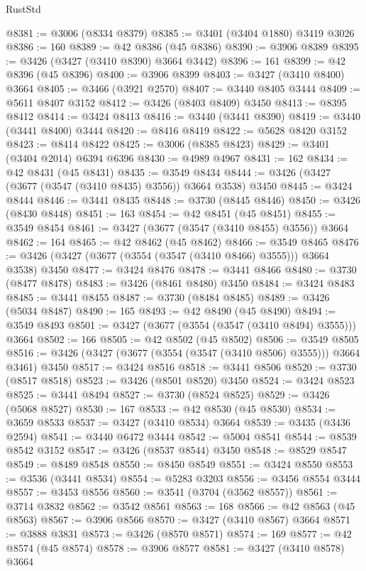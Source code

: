 \begin{lexlean}{RustStd}
\begin{coremodule}
@8381 := @3006 (@8334 @8379)
@8385 := @3401 (@3404 @1880) @3419 @3026
@8386 := 160
@8389 := @42 @8386 (@45 @8386)
@8390 := @3906 @8389
@8395 := @3426 (@3427 (@3410 @8390) @3664 @3442)
@8396 := 161
@8399 := @42 @8396 (@45 @8396)
@8400 := @3906 @8399
@8403 := @3427 (@3410 @8400) @3664
@8405 := @3466 (@3921 @2570)
@8407 := @3440 @8405 @3444
@8409 := @5611 @8407 @3152
@8412 := @3426 (@8403 @8409) @3450
@8413 := @8395 @8412
@8414 := @3424 @8413
@8416 := @3440 (@3441 @8390)
@8419 := @3440 (@3441 @8400) @3444
@8420 := @8416 @8419
@8422 := @5628 @8420 @3152
@8423 := @8414 @8422
@8425 := @3006 (@8385 @8423)
@8429 := @3401 (@3404 @2014) @6394 @6396
@8430 := @4989 @4967
@8431 := 162
@8434 := @42 @8431 (@45 @8431)
@8435 := @3549 @8434
@8444 := @3426 (@3427 (@3677 (@3547 (@3410 @8435) @3556)) @3664 @3538) @3450
@8445 := @3424 @8444
@8446 := @3441 @8435
@8448 := @3730 (@8445 @8446)
@8450 := @3426 (@8430 @8448)
@8451 := 163
@8454 := @42 @8451 (@45 @8451)
@8455 := @3549 @8454
@8461 := @3427 (@3677 (@3547 (@3410 @8455) @3556)) @3664
@8462 := 164
@8465 := @42 @8462 (@45 @8462)
@8466 := @3549 @8465
@8476 := @3426 (@3427 (@3677 (@3554 (@3547 (@3410 @8466) @3555))) @3664 @3538) @3450
@8477 := @3424 @8476
@8478 := @3441 @8466
@8480 := @3730 (@8477 @8478)
@8483 := @3426 (@8461 @8480) @3450
@8484 := @3424 @8483
@8485 := @3441 @8455
@8487 := @3730 (@8484 @8485)
@8489 := @3426 (@5034 @8487)
@8490 := 165
@8493 := @42 @8490 (@45 @8490)
@8494 := @3549 @8493
@8501 := @3427 (@3677 (@3554 (@3547 (@3410 @8494) @3555))) @3664
@8502 := 166
@8505 := @42 @8502 (@45 @8502)
@8506 := @3549 @8505
@8516 := @3426 (@3427 (@3677 (@3554 (@3547 (@3410 @8506) @3555))) @3664 @3461) @3450
@8517 := @3424 @8516
@8518 := @3441 @8506
@8520 := @3730 (@8517 @8518)
@8523 := @3426 (@8501 @8520) @3450
@8524 := @3424 @8523
@8525 := @3441 @8494
@8527 := @3730 (@8524 @8525)
@8529 := @3426 (@5068 @8527)
@8530 := 167
@8533 := @42 @8530 (@45 @8530)
@8534 := @3659 @8533
@8537 := @3427 (@3410 @8534) @3664
@8539 := @3435 (@3436 @2594)
@8541 := @3440 @6472 @3444
@8542 := @5004 @8541
@8544 := @8539 @8542 @3152
@8547 := @3426 (@8537 @8544) @3450
@8548 := @8529 @8547
@8549 := @8489 @8548
@8550 := @8450 @8549
@8551 := @3424 @8550
@8553 := @3536 (@3441 @8534)
@8554 := @5283 @3203
@8556 := @3456 @8554 @3444
@8557 := @3453 @8556
@8560 := @3541 (@3704 (@3562 @8557))
@8561 := @3714 @3832
@8562 := @3542 @8561
@8563 := 168
@8566 := @42 @8563 (@45 @8563)
@8567 := @3906 @8566
@8570 := @3427 (@3410 @8567) @3664
@8571 := @3888 @3831
@8573 := @3426 (@8570 @8571)
@8574 := 169
@8577 := @42 @8574 (@45 @8574)
@8578 := @3906 @8577
@8581 := @3427 (@3410 @8578) @3664

\end{coremodule}
\end{lexlean}

